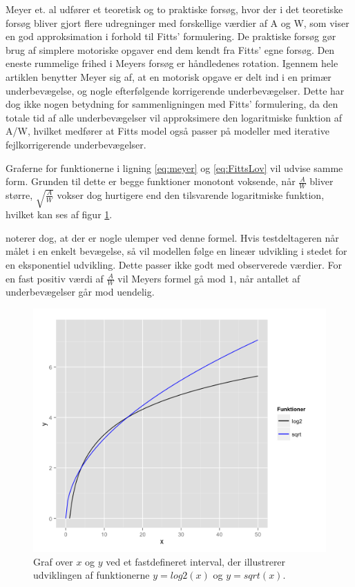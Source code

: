 Meyer et. al udfører et teoretisk og to praktiske forsøg, hvor der i det teoretiske forsøg bliver gjort flere udregninger med forskellige værdier af A og W, som viser en god approksimation i forhold til Fitts' formulering. De praktiske forsøg gør brug af simplere motoriske opgaver end dem kendt fra Fitts' egne forsøg. Den eneste rummelige frihed i Meyers forsøg er håndledenes rotation. Igennem hele artiklen benytter Meyer sig af, at en motorisk opgave er delt ind i en primær underbevægelse, og nogle efterfølgende korrigerende underbevægelser. Dette har dog ikke nogen betydning for sammenligningen med Fitts’ formulering, da den totale tid af alle underbevægelser vil approksimere den logaritmiske funktion af A/W, hvilket medfører at Fitts model også passer på modeller med iterative fejlkorrigerende underbevægelser.

Graferne for funktionerne i ligning \ref{eq:meyer} og \ref{eq:FittsLov} vil udvise samme form. Grunden til dette er begge funktioner monotont voksende, når $\frac{A}{W}$ bliver større, $\sqrt{\frac{A}{W}}$ vokser dog hurtigere end den tilsvarende logaritmiske funktion, hvilket kan ses af figur \ref{fig:log_vs_sqrt}. 

\cite{goldberg2015} noterer dog, at der er nogle ulemper ved denne formel. Hvis testdeltageren når målet i en enkelt bevægelse, så vil modellen følge en lineær udvikling i stedet for en eksponentiel udvikling. Dette passer ikke godt med observerede værdier. For en fast positiv værdi af $\frac{A}{W}$ vil Meyers formel gå mod $1$, når antallet af underbevægelser går mod uendelig.

\begin{figure}[h]
\centering
\includegraphics[width=.7\linewidth]{images/illustrations/meyer_plot_comparison}
\caption{Graf over $x$ og $y$ ved et fastdefineret interval, der illustrerer udviklingen af funktionerne $y=log2(x)$ og $y=sqrt(x)$.}
\label{fig:log_vs_sqrt}
\end{figure}

